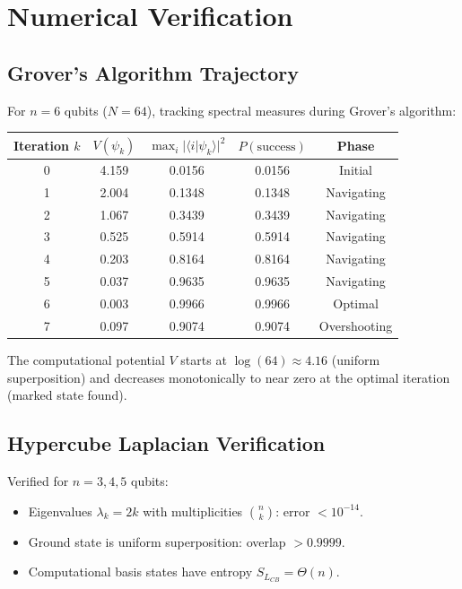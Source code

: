 \documentclass[11pt,a4paper]{article}
\theoremstyle{plain}
\theoremstyle{definition}
\theoremstyle{remark}
\newcommand{\braket}[2]{\langle#1|#2\rangle}
\begin{document}
\appendix
\section{Numerical Verification}

\subsection{Grover's Algorithm Trajectory}

For $n = 6$ qubits ($N = 64$), tracking spectral measures during Grover's algorithm:

\begin{center}
\begin{tabular}{c|cccc}
\toprule
Iteration $k$ & $V(\psi_k)$ & $\max_i |\braket{i}{\psi_k}|^2$ & $P(\text{success})$ & Phase \\
\midrule
0 & 4.159 & 0.0156 & 0.0156 & Initial \\
1 & 2.004 & 0.1348 & 0.1348 & Navigating \\
2 & 1.067 & 0.3439 & 0.3439 & Navigating \\
3 & 0.525 & 0.5914 & 0.5914 & Navigating \\
4 & 0.203 & 0.8164 & 0.8164 & Navigating \\
5 & 0.037 & 0.9635 & 0.9635 & Navigating \\
6 & 0.003 & 0.9966 & 0.9966 & Optimal \\
7 & 0.097 & 0.9074 & 0.9074 & Overshooting \\
\bottomrule
\end{tabular}
\end{center}

The computational potential $V$ starts at $\log(64) \approx 4.16$ (uniform superposition) and decreases monotonically to near zero at the optimal iteration (marked state found).

\subsection{Hypercube Laplacian Verification}

Verified for $n = 3, 4, 5$ qubits:

\begin{itemize}[noitemsep]
    \item Eigenvalues $\lambda_k = 2k$ with multiplicities $\binom{n}{k}$: error $< 10^{-14}$.
    \item Ground state is uniform superposition: overlap $> 0.9999$.
    \item Computational basis states have entropy $S_{L_{CB}} = \Theta(n)$.
\end{itemize}
\end{document}
